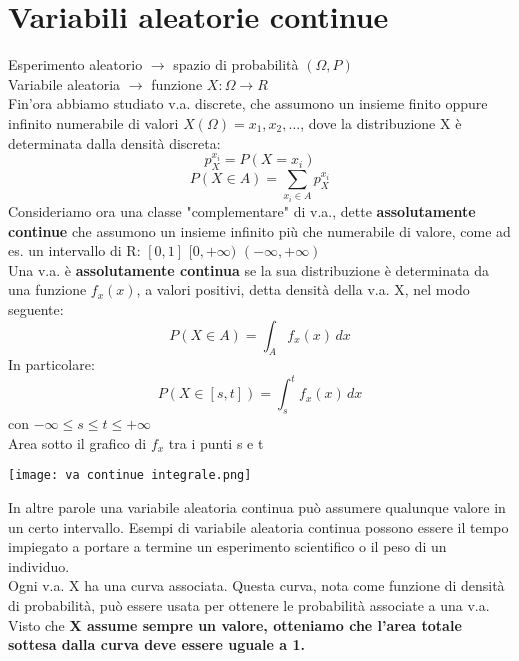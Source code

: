 \section{Variabili aleatorie continue}
Esperimento aleatorio $\to$ spazio di probabilità $(\Omega, P)$
\\ Variabile aleatoria $\to$ funzione $X:\Omega \to R$
\\Fin'ora abbiamo studiato v.a. discrete, che assumono un insieme finito oppure
infinito numerabile di valori $X(\Omega) = {x_1, x_2, \dots}$, dove la distribuzione
X è determinata dalla densità discreta:
\begin{equation*}
    p_X^{x_i} = P(X=x_i)
\end{equation*}
\begin{equation}
    P(X \in A) = \sum_{x_i \in A}p_X^{x_i}  
\end{equation}
Consideriamo ora una classe "complementare" di v.a., dette \textbf{assolutamente continue}
che assumono un insieme infinito più che numerabile di valore, come ad es. un intervallo
di R: $[0, 1]$ $[0, +\infty)$ $(-\infty, +\infty)$
\\ Una v.a. è \textbf{assolutamente continua} se la sua distribuzione è determinata
da una funzione $f_x(x)$, a valori positivi, detta densità della v.a. X, nel modo
seguente:
\begin{equation*}
    P(X \in A) = \int_{A}f_x (x) \,dx 
\end{equation*}
In particolare:
\begin{equation*}
    P(X\in[s,t]) = \int_{s}^{t} f_x (x)\,dx 
\end{equation*}
con $-\infty \leq s \leq t \leq +\infty$
\\Area sotto il grafico di $f_x$ tra i punti s e t
\begin{center}
    \texttt{[image: va continue integrale.png]}
\end{center}
In altre parole una variabile aleatoria continua può assumere qualunque valore in un
certo intervallo. Esempi di variabile aleatoria continua possono essere il tempo impiegato a
portare a termine un esperimento scientifico o il peso di un individuo.
\\ Ogni v.a. X ha una curva associata. Questa curva, nota come funzione di densità
di probabilità, può essere usata per ottenere le probabilità associate a una v.a.
\\ Visto che \textbf{X assume sempre un valore, otteniamo che l'area totale sottesa dalla curva
deve essere uguale a 1.}
